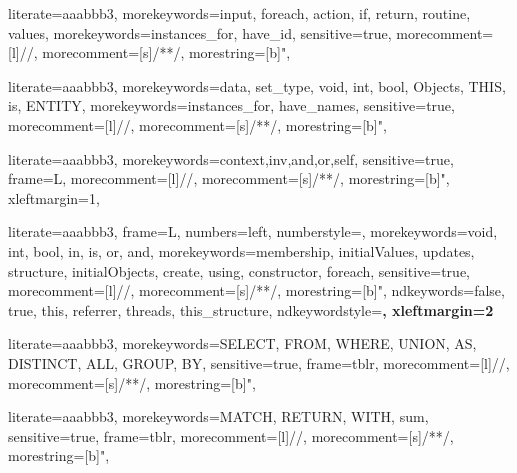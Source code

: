 
{
literate={aaa}{bbb}3,
morekeywords={input, foreach, action, if, return, routine, values},
morekeywords={instances_for, have_id},
sensitive=true,
morecomment=[l]{//},
morecomment=[s]{/*}{*/},
morestring=[b]",
}

{
literate={aaa}{bbb}3,
morekeywords={data, set_type, void, int, bool, Objects, THIS, is, ENTITY},
morekeywords={instances_for, have_names},
sensitive=true,
morecomment=[l]{//},
morecomment=[s]{/*}{*/},
morestring=[b]",
}

{
literate={aaa}{bbb}3,
morekeywords={context,inv,and,or,self},
sensitive=true,
frame=L,
morecomment=[l]{//},
morecomment=[s]{/*}{*/},
morestring=[b]",
xleftmargin=1\parindent,
}

{
literate={aaa}{bbb}3,
frame=L, %
numbers=left,
numberstyle=\color{black}\scriptsize,
morekeywords={void, int, bool, in, is, or, and},
morekeywords={membership, initialValues, updates, structure, initialObjects, create, using, constructor, foreach},
sensitive=true,
morecomment=[l]{//},
morecomment=[s]{/*}{*/},
morestring=[b]",
ndkeywords={false, true, this, referrer, threads, this_structure},
ndkeywordstyle=\color{blue}\bfseries,
xleftmargin=2\parindent
}

{
literate={aaa}{bbb}3,
morekeywords={SELECT, FROM, WHERE, UNION, AS, DISTINCT, ALL, GROUP, BY},
sensitive=true,
frame=tblr,
morecomment=[l]{//},
morecomment=[s]{/*}{*/},
morestring=[b]",
}

{
literate={aaa}{bbb}3,
morekeywords={MATCH, RETURN, WITH, sum},
sensitive=true,
frame=tblr,
morecomment=[l]{//},
morecomment=[s]{/*}{*/},
morestring=[b]",
}
